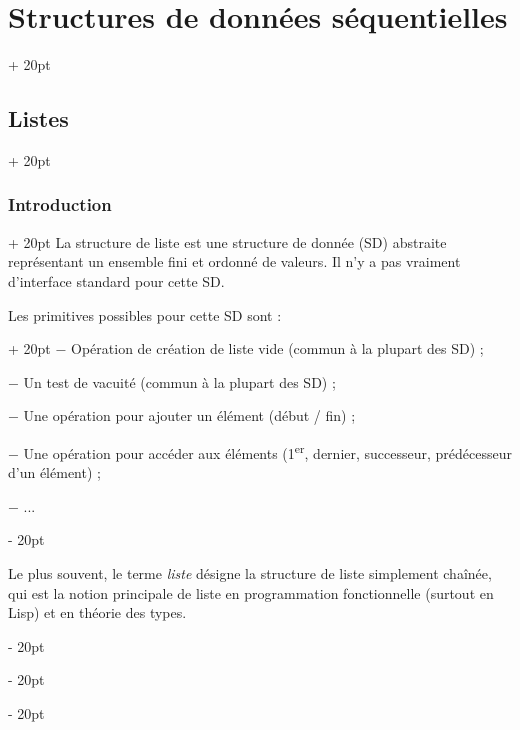 \documentclass[a4paper, 12pt, twoside]{article}
\newcommand{\ind}[1][20pt]{\advance\leftskip + #1}
\newcommand{\deind}[1][20pt]{\advance\leftskip - #1}
\newenvironment{indt}[2][20pt]{#2 \par \ind[#1]}{\par \deind} %
\begin{document}
    \vspace{12pt}
    
    \begin{indt}{\section{Structures de données séquentielles}}
        
        \begin{indt}{\subsection{Listes}}
            \begin{indt}{\subsubsection{Introduction}}
                La structure de liste est une structure de donnée (SD) abstraite représentant un ensemble fini et ordonné de valeurs. Il n'y a pas vraiment d'interface standard pour cette SD.
                
                \begin{indt}{Les primitives possibles pour cette SD sont :}
                    $-$ Opération de création de liste vide (commun à la plupart des SD) ;
                    
                    $-$ Un test de vacuité (commun à la plupart des SD) ;
                    
                    $-$ Une opération pour ajouter un élément (début / fin) ;
                    
                    $-$ Une opération pour accéder aux éléments (1\textsuperscript{er}, dernier, successeur, prédécesseur d'un élément) ;
                    
                    $-$ ...
                \end{indt}
                
                \vspace{6pt}
                
                Le plus souvent, le terme \textit{liste} désigne la structure de liste simplement chaînée, qui est la notion principale de liste en programmation fonctionnelle (surtout en Lisp) et en théorie des types.
            \end{indt}
            
            \vspace{6pt}
            

\end{indt}
\end{indt}
\end{document}
